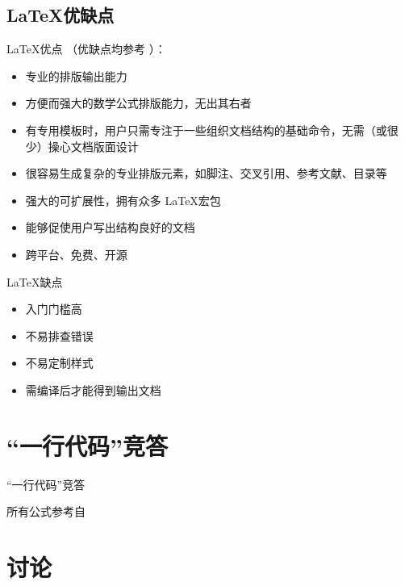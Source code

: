 \documentclass{beamer}
\begin{document}
\subsection{\LaTeX 优缺点}
\begin{frame}{\LaTeX 优点}
（优缺点均参考 \cite{lshort-cn}）：
\begin{itemize}
\item 专业的排版输出能力
\item 方便而强大的数学公式排版能力，无出其右者
\item 有专用模板时，用户只需专注于一些组织文档结构的基础命令，无需（或很少）操心文档版面设计
\item 很容易生成复杂的专业排版元素，如脚注、交叉引用、参考文献、目录等
\item 强大的可扩展性，拥有众多 \LaTeX 宏包
\item 能够促使用户写出结构良好的文档
\item 跨平台、免费、开源
\end{itemize}
\end{frame}

\begin{frame}{\LaTeX 缺点}
\begin{itemize}
\item 入门门槛高
\item 不易排查错误
\item 不易定制样式
\item 需编译后才能得到输出文档
\end{itemize}
\end{frame}

\section[竞答]{“一行代码”竞答}
\begin{frame}[allowframebreaks]{“一行代码”竞答}

所有公式参考自 \cites{Zorich,Kostrikin}


\end{frame}

\section[讨论]{讨论}
\end{document}
